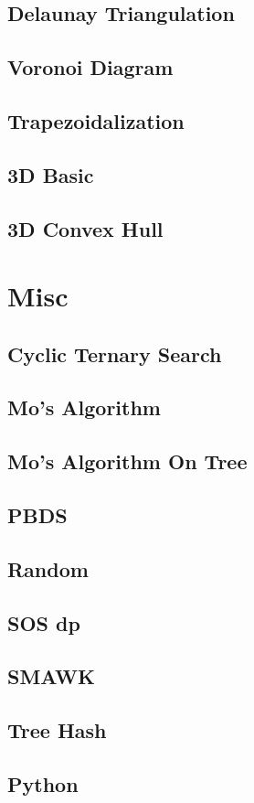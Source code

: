 \subsection{Delaunay Triangulation}

\subsection{Voronoi Diagram}

\subsection{Trapezoidalization}

\subsection{3D Basic}

\subsection{3D Convex Hull}


\section{Misc}
\subsection{Cyclic Ternary Search}

\subsection{Mo's Algorithm}

\subsection{Mo's Algorithm On Tree}

\subsection{PBDS}

%
\subsection{Random}

\subsection{SOS dp}

\subsection{SMAWK}

\subsection{Tree Hash}

\subsection{Python}

